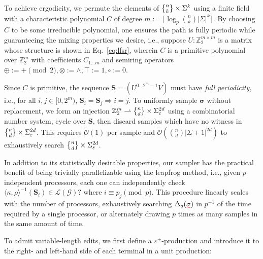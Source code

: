 \documentclass[sigplan,review,anonymous,acmsmall]{acmart}\settopmatter{printfolios=false,printccs=false,printacmref=false}
\begin{document}
To achieve ergodicity, we permute the elements of $\stirlingii{n}{k}\times\Sigma^k$ using a finite field with a characteristic polynomial $C$ of degree $m:=\lceil \log_p {n \choose k}|\Sigma|^k \rceil$. By choosing $C$ to be some irreducible polynomial, one ensures the path is fully periodic while guaranteeing the mixing properties we desire, i.e., suppose $U: \mathbb{Z}_2^{m\times m}$ is a matrix whose structure is shown in Eq.~\ref{eq:lfsr}, wherein $C$ is a primitive polynomial over $\mathbb{Z}_2^m$ with coefficients $C_{1\ldots m}$ and semiring operators $\oplus := + \pmod 2, \otimes := \land, \top := 1, \circ:=0$.

Since $C$ is primitive, the sequence $\mathbf{S} = (U^{0 \ldots 2^m-1}V)$ must have \textit{full periodicity}, i.e., for all $i, j \in[0, 2^m)$, ${\mathbf{S}_i = \mathbf{S}_j \Rightarrow i = j}$. To uniformly sample $\bm\sigma$ without replacement, we form an injection $\mathbb{Z}_2^m\rightharpoonup\stirlingii{n}{d}\times\Sigma_\varepsilon^{2d}$ using a combinatorial number system, cycle over $\mathbf{S}$, then discard samples which have no witness in $\stirlingii{n}{d}\times\Sigma_\varepsilon^{2d}$. This requires $\widetilde{\mathcal O}(1)$ per sample and $\widetilde{\mathcal O}\left({n \choose d}|\Sigma + 1|^{2d}\right)$ to exhaustively search $\stirlingii{n}{d}\times\Sigma_\varepsilon^{2d}$.

In addition to its statistically desirable properties, our sampler has the practical benefit of being trivially parallelizable using the leapfrog method, i.e., given $p$ independent processors, each one can independently check $\langle\kappa, \rho\rangle^{-1}(\mathbf{S}_{i}) \in \mathcal{L}(\mathcal{G})?$ where $i \equiv p_j \pmod p$. This procedure linearly scales with the number of processors, exhaustively searching $\Delta_{q}(\err{\sigma})$ in $p^{-1}$ of the time required by a single processor, or alternately drawing $p$ times as many samples in the same amount of time.

To admit variable-length edits, we first define a $\varepsilon^+$-production and introduce it to the right- and left-hand side of each terminal in a unit production:\vspace{5pt}

\end{document}
